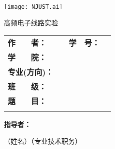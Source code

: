 \documentclass[twoside, openright]{report}
\numberwithin{Exercise}{chapter}
\numberwithin{Answer}{chapter}
\begin{document}

\newcommand{\Title}{高频电子线路实验}

\begin{titlepage}
	\centering
	\begin{spacing}{1}
		\vspace{0.5\ccwd}

		\vspace{1\ccwd}

		\texttt{[image: NJUST.ai]}

		\vspace{0.2\ccwd}

		\fontsize{45pt}{45pt}\selectfont\heiti
		\Title

		\vspace{2\ccwd}
	\end{spacing}

	\begin{spacing}{1.5}
		\begin{tabu} to 12.59cm{@{}X[c, 3.2cm]@{}X[c, 4cm]@{}X[c, 2.22cm]@{}X[c, 3.89cm]@{}}
			\textbf{作　　者：} & \underline{} & \textbf{学　号：} & \underline{} \\
			\textbf{学　　院：} &  \\
			\textbf{专业(方向)：} &  \\
			\textbf{班　　级：} &  \\
			\textbf{题　　目：} &  \\
			\textbf{} & 
		\end{tabu}
		\vspace{0em}
	\end{spacing}

	\begin{spacing}{1}
		\vspace{3\ccwd}

		\textbf{指导者：}\underline{\makebox[15.5\ccwd][c]{}}

		\hspace{5em}（姓名）\hspace{11em}（专业技术职务）


\end{spacing}
\end{titlepage}
\end{document}
